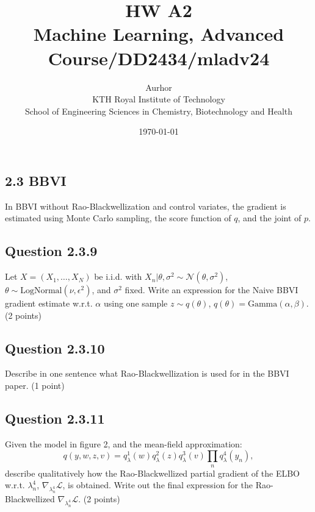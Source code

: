 \documentclass{article}
\title{HW A2\\\Large{Machine Learning, Advanced Course/DD2434/mladv24}}
\author{Aurhor \\ KTH Royal Institute of Technology\\ School of Engineering Sciences in Chemistry, Biotechnology and Health}
\date{\today}
\begin{document}
\maketitle

\fancyfoot[C]{\thepage}
\begin{multicols}{2}



\section*{2.3 BBVI}
In BBVI without Rao-Blackwellization and control variates, the gradient is estimated using Monte Carlo sampling, the score function of \(q\), and the joint of \(p\).


\subsection*{Question 2.3.9}
Let \(X = (X_1, \dots, X_N)\) be i.i.d. with \(X_n | \theta, \sigma^2 \sim \mathcal{N}(\theta, \sigma^2)\), \(\theta \sim \text{LogNormal}(\nu, \epsilon^2)\), and \(\sigma^2\) fixed. Write an expression for the Naive BBVI gradient estimate w.r.t. \(\alpha\) using one sample \(z \sim q(\theta)\), \(q(\theta) = \text{Gamma}(\alpha, \beta)\). (2 points)


\subsection*{Question 2.3.10}
Describe in one sentence what Rao-Blackwellization is used for in the BBVI paper. (1 point)

\subsection{Question 2.3.11}
Given the model in figure 2, and the mean-field approximation:  
\[
q(y, w, z, v) = q_\lambda^1(w)q_\lambda^2(z)q_\lambda^3(v)\prod_n q_\lambda^4(y_n),
\]
describe qualitatively how the Rao-Blackwellized partial gradient of the ELBO w.r.t. \(\lambda_n^4\), \(\nabla_{\lambda_n^4} \mathcal{L}\), is obtained. Write out the final expression for the Rao-Blackwellized \(\nabla_{\lambda_n^4} \mathcal{L}\). (2 points)







\end{multicols}
\clearpage
{}
\end{document}
